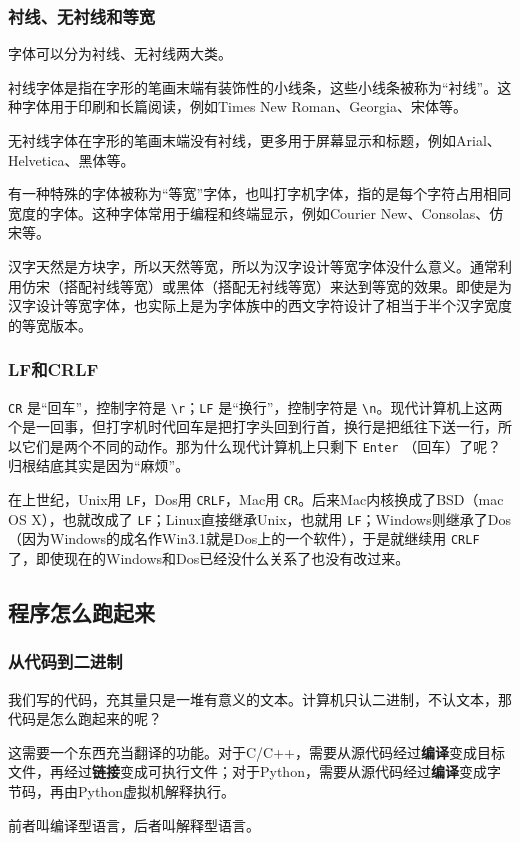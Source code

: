 \documentclass[fontset=none,aspectratio=1610]{ctexbeamer}
\begin{document}
\begin{frame}
    \frametitle{衬线、无衬线和等宽}

    字体可以分为衬线、无衬线两大类。

    衬线字体是指在字形的笔画末端有装饰性的小线条，这些小线条被称为“衬线”。这种字体用于印刷和长篇阅读，例如Times New Roman、Georgia、宋体等。

    \textsf{无衬线字体在字形的笔画末端没有衬线，更多用于屏幕显示和标题，例如Arial、Helvetica、黑体等。}

    有一种特殊的字体被称为“等宽”字体，也叫打字机字体，指的是每个字符占用相同宽度的字体。这种字体常用于编程和终端显示，例如Courier New、Consolas、仿宋等。

    汉字天然是方块字，所以天然等宽，所以为汉字设计等宽字体没什么意义。通常利用仿宋（搭配衬线等宽）或黑体（搭配无衬线等宽）来达到等宽的效果。即使是为汉字设计等宽字体，也实际上是为字体族中的西文字符设计了相当于半个汉字宽度的等宽版本。

\end{frame}

\begin{frame}
    \frametitle{LF和CRLF}

    \texttt{CR} 是“回车”，控制字符是 \texttt{\textbackslash r}；\texttt{LF} 是“换行”，控制字符是 \texttt{\textbackslash n}。现代计算机上这两个是一回事，但打字机时代回车是把打字头回到行首，换行是把纸往下送一行，所以它们是两个不同的动作。那为什么现代计算机上只剩下 \texttt{Enter} （回车）了呢？归根结底其实是因为“麻烦”。

    在上世纪，Unix用 \texttt{LF}，Dos用 \texttt{CRLF}，Mac用 \texttt{CR}。后来Mac内核换成了BSD（mac OS X），也就改成了 \texttt{LF}；Linux直接继承Unix，也就用 \texttt{LF}；Windows则继承了Dos（因为Windows的成名作Win3.1就是Dos上的一个软件），于是就继续用 \texttt{CRLF} 了，即使现在的Windows和Dos已经没什么关系了也没有改过来。

\end{frame}

\subsection{程序怎么跑起来}

\begin{frame}
    \frametitle{从代码到二进制}

    我们写的代码，充其量只是一堆有意义的文本。计算机只认二进制，不认文本，那代码是怎么跑起来的呢？

    这需要一个东西充当翻译的功能。对于C/C++，需要从源代码经过\textbf{编译}变成目标文件，再经过\textbf{链接}变成可执行文件；对于Python，需要从源代码经过\textbf{编译}变成字节码，再由Python虚拟机解释执行。

    前者叫编译型语言，后者叫解释型语言。

\end{frame}
\end{document}
